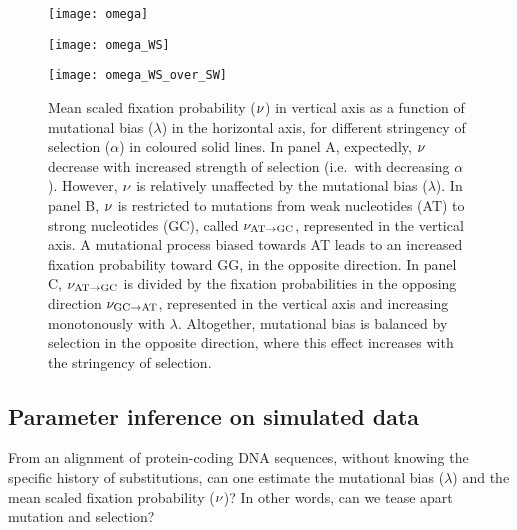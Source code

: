 \begin{figure}[htbp]
    \centering
    \begin{minipage}{0.32\linewidth}
        \texttt{[image: omega]}
    \end{minipage}
    \hfill
    \begin{minipage}{0.32\linewidth}
        \texttt{[image: omega\_WS]}
    \end{minipage}
    \hfill
    \begin{minipage}{0.32\linewidth}
        \texttt{[image: omega\_WS\_over\_SW]}
    \end{minipage}
    \hfill
    \caption[Mean scaled fixation probability as a function of the parameters]{
    Mean scaled fixation probability ($\nu$) in vertical axis as a function of mutational bias ($\lambda$) in the horizontal axis, for different stringency of selection ($\alpha$) in coloured solid lines.
    In panel A, expectedly, $\nu$ decrease with increased strength of selection (i.e.~with decreasing $\alpha$).
    However, $\nu$ is relatively unaffected by the mutational bias ($\lambda$).
    In panel B, $\nu$ is restricted to mutations from weak nucleotides (AT) to strong nucleotides (GC), called $\nu_{\text{AT} \rightarrow \text{GC}}$, represented in the vertical axis.
    A mutational process biased towards AT leads to an increased fixation probability toward GG, in the opposite direction.
    In panel C, $\nu_{\text{AT} \rightarrow \text{GC}}$ is divided by the fixation probabilities in the opposing direction $\nu_{\text{GC} \rightarrow \text{AT}}$, represented in the vertical axis and increasing monotonously with $\lambda$.
    Altogether, mutational bias is balanced by selection in the opposite direction, where this effect increases with the stringency of selection.
    }
    \label{fig:mut-bias-omega-WS}
\end{figure}

\subsection{Parameter inference on simulated data}
\label{subsec:parameter-inference-on-simulated-data}

From an alignment of protein-coding \acrshort{DNA} sequences, without knowing the specific history of substitutions, can one estimate the mutational bias ($\lambda$) and the mean scaled fixation probability ($\nu$)?
In other words, can we tease apart mutation and selection?

